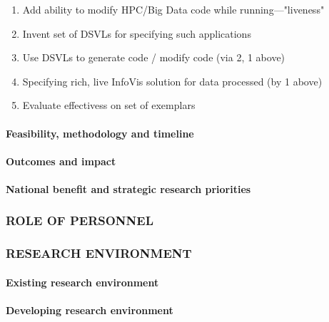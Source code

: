\documentclass[a4paper]{scrartcl}
\begin{document}
\begin{enumerate}
\item Add ability to modify HPC/Big Data code while
  running---"liveness"
\item Invent set of DSVLs for specifying such applications
\item Use DSVLs to generate code / modify code (via 2, 1 above)
\item Specifying rich, live InfoVis solution for data processed (by 1
  above)
\item Evaluate effectivess on set of exemplars
\end{enumerate}

\paragraph*{Feasibility, methodology and timeline}



\paragraph*{Outcomes and impact}



\paragraph*{National benefit and strategic research priorities}



\subsubsection*{ROLE OF PERSONNEL}



\subsubsection*{RESEARCH ENVIRONMENT}

\paragraph*{Existing research environment}



\paragraph*{Developing research environment}
\end{document}
